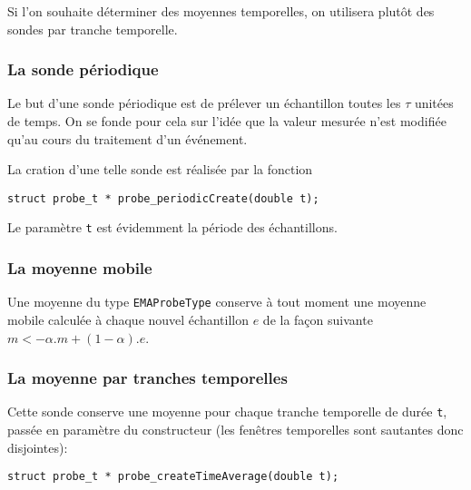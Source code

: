    Si l'on souhaite déterminer des moyennes temporelles, on utilisera
plutôt des sondes par tranche temporelle.

%
\subsubsection{La sonde périodique}

   Le but d'une sonde périodique est de prélever un échantillon toutes
les $\tau$ unitées de temps. On se fonde pour cela sur l'idée que la
valeur mesurée n'est modifiée qu'au cours du traitement d'un
événement.

   La cration d'une telle sonde est réalisée par la fonction 

\begin{verbatim}
struct probe_t * probe_periodicCreate(double t);
\end{verbatim}

   Le paramètre {\tt t} est évidemment la période des échantillons.

%
\subsubsection{La moyenne mobile}

   Une moyenne du type \lstinline!EMAProbeType! conserve à tout moment
une moyenne mobile calculée à chaque nouvel échantillon $e$ de la façon
suivante $m <- \alpha . m + (1 - \alpha).e$.

%
\subsubsection{La moyenne par tranches temporelles}

   Cette sonde conserve une moyenne pour chaque tranche temporelle de
durée {\tt t}, passée en paramètre du constructeur (les fenêtres
temporelles sont sautantes donc disjointes):

\begin{verbatim}
struct probe_t * probe_createTimeAverage(double t);
\end{verbatim}

